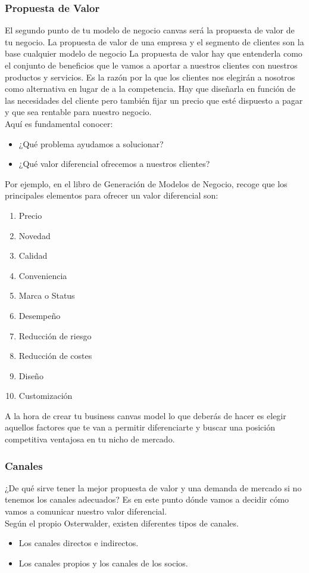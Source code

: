 \documentclass[preprint,12pt]{elsarticle}
\begin{document}
\subsubsection{Propuesta de Valor}
El segundo punto de tu modelo de negocio canvas será la propuesta de valor de tu negocio.
La propuesta de valor de una empresa y el segmento de clientes son la base cualquier modelo de negocio
La propuesta de valor hay que entenderla como el conjunto de beneficios que le vamos a aportar a nuestros clientes con nuestros productos y servicios.
Es la razón por la que los clientes nos elegirán a nosotros como alternativa en lugar de a la competencia.
Hay que diseñarla en función de las necesidades del cliente pero también fijar un precio que esté dispuesto a pagar y que sea rentable para nuestro negocio.\\
Aquí es fundamental conocer:\\
\begin{itemize}
\item ¿Qué problema ayudamos a solucionar?
\item ¿Qué valor diferencial ofrecemos a nuestros clientes?
\end{itemize}
Por ejemplo, en el libro de Generación de Modelos de Negocio, recoge que los principales elementos para ofrecer un valor diferencial son:\\
\begin{enumerate}[1.]
\item Precio
\item Novedad
\item Calidad
\item Conveniencia
\item Marca o Status
\item Desempeño
\item Reducción de riesgo
\item Reducción de costes
\item Diseño
\item Customización
\end{enumerate}
A la hora de crear tu business canvas model lo que deberás de hacer es elegir aquellos factores que te van a permitir diferenciarte y buscar una posición competitiva ventajosa en tu nicho de mercado.

\subsubsection{Canales}
¿De qué sirve tener la mejor propuesta de valor y una demanda de mercado si no tenemos los canales adecuados?
Es en este punto dónde vamos a decidir cómo vamos a comunicar nuestro valor diferencial.\\
Según el propio Osterwalder, existen diferentes tipos de canales.\\
\begin{itemize}
\item Los canales directos e indirectos.
\item Los canales propios y los canales de los socios.
\end{itemize}
\end{document}
